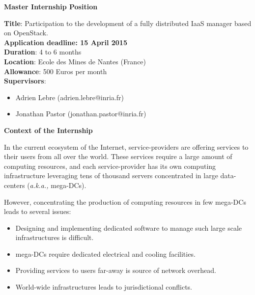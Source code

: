 \documentclass{letter}
\begin{document}
\address{B216 - Ecole des Mines de Nantes\\
4, rue Alfred Kastler, BP 20722\\
44307 Nantes Cedex 3,\\
France}


\begin{letter}
{\Large \textbf{Master Internship Position}}

\date{}

\opening{}


{\textbf{Title}: Participation to the development of a fully distributed
 IaaS manager based on OpenStack.\\
\textbf{Application deadline: 15 April 2015}
\\
\textbf{Duration}: 4 to 6 months\\
\textbf{Location}: Ecole des Mines de Nantes (France)\\
\textbf{Allowance}: 500 Euros per month\\
\textbf{Supervisors}: \begin{itemize}
\item Adrien Lebre (adrien.lebre@inria.fr)
\item Jonathan Pastor (jonathan.pastor@inria.fr)
\end{itemize}
}

{\Large \textbf{Context of the Internship}}

In the current ecosystem of the Internet, service-providers are offering services
to their users from all over the world. These services require
a large amount of computing resources, and each service-provider has its own computing
infrastructure leveraging tens of thousand servers concentrated in large
data-centers (\textit{a.k.a., } mega-DCs).

However, concentrating the production of computing resources in few
mega-DCs  leads to several
issues:

\begin{itemize}
\item  Designing and implementing dedicated software to manage such large scale infrastructures is
difficult.
\item mega-DCs require dedicated electrical and cooling facilities.
\item Providing services to users far-away  is source of network overhead.
\item World-wide infrastructures leads to jurisdictional conflicts.
\end{itemize}


\end{letter}
\end{document}
